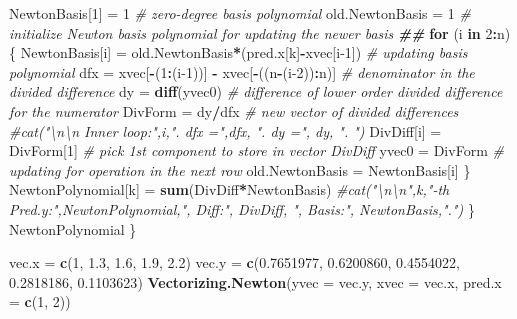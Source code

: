 \documentclass[
]{book}
\newenvironment{Shaded}{\begin{snugshade}}{\end{snugshade}}
\newcommand{\AttributeTok}[1]{\textcolor[rgb]{0.13,0.29,0.53}{#1}}
\newcommand{\CommentTok}[1]{\textcolor[rgb]{0.56,0.35,0.01}{\textit{#1}}}
\newcommand{\ControlFlowTok}[1]{\textcolor[rgb]{0.13,0.29,0.53}{\textbf{#1}}}
\newcommand{\DecValTok}[1]{\textcolor[rgb]{0.00,0.00,0.81}{#1}}
\newcommand{\DocumentationTok}[1]{\textcolor[rgb]{0.56,0.35,0.01}{\textbf{\textit{#1}}}}
\newcommand{\FloatTok}[1]{\textcolor[rgb]{0.00,0.00,0.81}{#1}}
\newcommand{\FunctionTok}[1]{\textcolor[rgb]{0.13,0.29,0.53}{\textbf{#1}}}
\newcommand{\NormalTok}[1]{#1}
\newcommand{\OtherTok}[1]{\textcolor[rgb]{0.56,0.35,0.01}{#1}}
\newcommand{\SpecialCharTok}[1]{\textcolor[rgb]{0.81,0.36,0.00}{\textbf{#1}}}
\begin{document}
\begin{Shaded}
\begin{Highlighting}[]
\NormalTok{    NewtonBasis[}\DecValTok{1}\NormalTok{] }\OtherTok{=} \DecValTok{1}         \CommentTok{\# zero{-}degree basis polynomial}
\NormalTok{    old.NewtonBasis }\OtherTok{=} \DecValTok{1}        \CommentTok{\# initialize Newton basis polynomial for updating the newer basis}
    \DocumentationTok{\#\#}
    \ControlFlowTok{for}\NormalTok{ (i }\ControlFlowTok{in} \DecValTok{2}\SpecialCharTok{:}\NormalTok{n)\{}
\NormalTok{       NewtonBasis[i] }\OtherTok{=}\NormalTok{ old.NewtonBasis}\SpecialCharTok{*}\NormalTok{(pred.x[k]}\SpecialCharTok{{-}}\NormalTok{xvec[i}\DecValTok{{-}1}\NormalTok{])  }\CommentTok{\# updating basis polynomial   }
\NormalTok{       dfx }\OtherTok{=}\NormalTok{ xvec[}\SpecialCharTok{{-}}\NormalTok{(}\DecValTok{1}\SpecialCharTok{:}\NormalTok{(i}\DecValTok{{-}1}\NormalTok{))] }\SpecialCharTok{{-}}\NormalTok{ xvec[}\SpecialCharTok{{-}}\NormalTok{((n}\SpecialCharTok{{-}}\NormalTok{(i}\DecValTok{{-}2}\NormalTok{))}\SpecialCharTok{:}\NormalTok{n)]     }\CommentTok{\# denominator in the divided difference}
\NormalTok{       dy }\OtherTok{=} \FunctionTok{diff}\NormalTok{(yvec0)         }\CommentTok{\# difference of lower order divided difference for the numerator}
\NormalTok{       DivForm }\OtherTok{=}\NormalTok{ dy}\SpecialCharTok{/}\NormalTok{dfx         }\CommentTok{\# new vector of divided differences}
       \CommentTok{\#cat("\textbackslash{}n\textbackslash{}n Inner loop:",i,". dfx =",dfx, ". dy =", dy, ". ")}
\NormalTok{       DivDiff[i] }\OtherTok{=}\NormalTok{ DivForm[}\DecValTok{1}\NormalTok{]  }\CommentTok{\# pick 1st component to store in vector DivDiff}
\NormalTok{       yvec0 }\OtherTok{=}\NormalTok{ DivForm          }\CommentTok{\# updating for operation in the next row}
\NormalTok{       old.NewtonBasis }\OtherTok{=}\NormalTok{ NewtonBasis[i]}
\NormalTok{      \}}
\NormalTok{      NewtonPolynomial[k] }\OtherTok{=} \FunctionTok{sum}\NormalTok{(DivDiff}\SpecialCharTok{*}\NormalTok{NewtonBasis)}
      \CommentTok{\#cat("\textbackslash{}n\textbackslash{}n",k,"{-}th Pred.y:",NewtonPolynomial,", Diff:", DivDiff, ", Basis:", NewtonBasis,".")}
\NormalTok{     \}}
\NormalTok{ NewtonPolynomial}
\NormalTok{\}}
\end{Highlighting}
\end{Shaded}

\begin{Shaded}
\begin{Highlighting}[]
\NormalTok{vec.x }\OtherTok{=} \FunctionTok{c}\NormalTok{(}\DecValTok{1}\NormalTok{, }\FloatTok{1.3}\NormalTok{, }\FloatTok{1.6}\NormalTok{, }\FloatTok{1.9}\NormalTok{, }\FloatTok{2.2}\NormalTok{)          }
\NormalTok{vec.y }\OtherTok{=} \FunctionTok{c}\NormalTok{(}\FloatTok{0.7651977}\NormalTok{, }\FloatTok{0.6200860}\NormalTok{, }\FloatTok{0.4554022}\NormalTok{, }\FloatTok{0.2818186}\NormalTok{, }\FloatTok{0.1103623}\NormalTok{)}
\FunctionTok{Vectorizing.Newton}\NormalTok{(}\AttributeTok{yvec =}\NormalTok{ vec.y, }\AttributeTok{xvec =}\NormalTok{ vec.x, }\AttributeTok{pred.x =} \FunctionTok{c}\NormalTok{(}\DecValTok{1}\NormalTok{, }\DecValTok{2}\NormalTok{))}
\end{Highlighting}
\end{Shaded}
\end{document}
